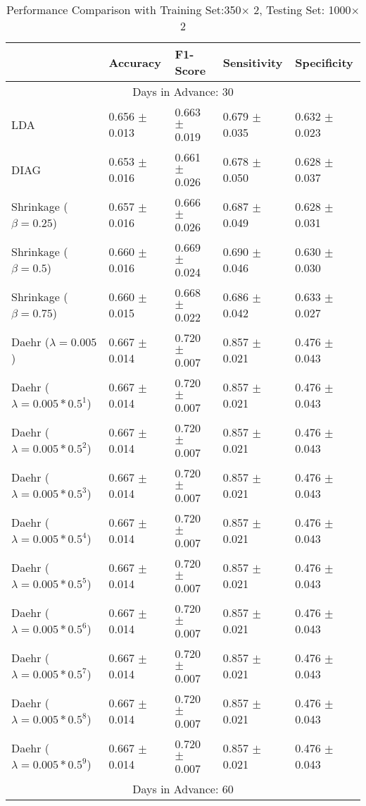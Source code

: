 \begin{table}
\caption{Performance Comparison with Training Set:350$\times$ 2, Testing Set: 1000$\times$2}
\footnotesize
\centering
\begin{tabular}{*{5}{l}}
\toprule
 & Accuracy & F1-Score & Sensitivity & Specificity\\
\hline\multicolumn{5}{c}{  Days in Advance: 30}\\\hline
LDA&0.656 $\pm$ 0.013&0.663 $\pm$ 0.019&0.679 $\pm$ 0.035&0.632 $\pm$ 0.023\\
DIAG&0.653 $\pm$ 0.016&0.661 $\pm$ 0.026&0.678 $\pm$ 0.050&0.628 $\pm$ 0.037\\
Shrinkage ($\beta=0.25$)&0.657 $\pm$ 0.016&0.666 $\pm$ 0.026&0.687 $\pm$ 0.049&0.628 $\pm$ 0.031\\
Shrinkage ($\beta=0.5$)&0.660 $\pm$ 0.016&0.669 $\pm$ 0.024&0.690 $\pm$ 0.046&0.630 $\pm$ 0.030\\
Shrinkage ($\beta=0.75$)&0.660 $\pm$ 0.015&0.668 $\pm$ 0.022&0.686 $\pm$ 0.042&0.633 $\pm$ 0.027\\
Daehr ($\lambda=0.005$)&0.667 $\pm$ 0.014&0.720 $\pm$ 0.007&0.857 $\pm$ 0.021&0.476 $\pm$ 0.043\\
Daehr ($\lambda=0.005*0.5^1$)&0.667 $\pm$ 0.014&0.720 $\pm$ 0.007&0.857 $\pm$ 0.021&0.476 $\pm$ 0.043\\
Daehr ($\lambda=0.005*0.5^2$)&0.667 $\pm$ 0.014&0.720 $\pm$ 0.007&0.857 $\pm$ 0.021&0.476 $\pm$ 0.043\\
Daehr ($\lambda=0.005*0.5^3$)&0.667 $\pm$ 0.014&0.720 $\pm$ 0.007&0.857 $\pm$ 0.021&0.476 $\pm$ 0.043\\
Daehr ($\lambda=0.005*0.5^4$)&0.667 $\pm$ 0.014&0.720 $\pm$ 0.007&0.857 $\pm$ 0.021&0.476 $\pm$ 0.043\\
Daehr ($\lambda=0.005*0.5^5$)&0.667 $\pm$ 0.014&0.720 $\pm$ 0.007&0.857 $\pm$ 0.021&0.476 $\pm$ 0.043\\
Daehr ($\lambda=0.005*0.5^6$)&0.667 $\pm$ 0.014&0.720 $\pm$ 0.007&0.857 $\pm$ 0.021&0.476 $\pm$ 0.043\\
Daehr ($\lambda=0.005*0.5^7$)&0.667 $\pm$ 0.014&0.720 $\pm$ 0.007&0.857 $\pm$ 0.021&0.476 $\pm$ 0.043\\
Daehr ($\lambda=0.005*0.5^8$)&0.667 $\pm$ 0.014&0.720 $\pm$ 0.007&0.857 $\pm$ 0.021&0.476 $\pm$ 0.043\\
Daehr ($\lambda=0.005*0.5^9$)&0.667 $\pm$ 0.014&0.720 $\pm$ 0.007&0.857 $\pm$ 0.021&0.476 $\pm$ 0.043\\
\hline\multicolumn{5}{c}{  Days in Advance: 60}\\\hline

\end{tabular}
\end{table}
